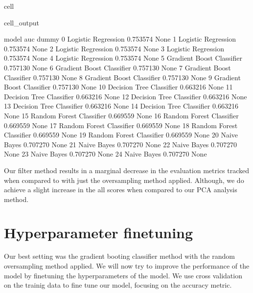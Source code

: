 \documentclass[letterpaper,10pt,english]{jupyterBook}
\begin{document}
\begin{sphinxuseclass}{cell}
\begin{sphinxVerbatimOutput}
\begin{sphinxuseclass}{cell_output}
\begin{sphinxVerbatim}[commandchars=\\\{\}]
                        model       auc dummy  
0        Logistic Regression   0.753574  None  
1        Logistic Regression   0.753574  None  
2        Logistic Regression   0.753574  None  
3        Logistic Regression   0.753574  None  
4        Logistic Regression   0.753574  None  
5   Gradient Boost Classifier  0.757130  None  
6   Gradient Boost Classifier  0.757130  None  
7   Gradient Boost Classifier  0.757130  None  
8   Gradient Boost Classifier  0.757130  None  
9   Gradient Boost Classifier  0.757130  None  
10   Decision Tree Classifier  0.663216  None  
11   Decision Tree Classifier  0.663216  None  
12   Decision Tree Classifier  0.663216  None  
13   Decision Tree Classifier  0.663216  None  
14   Decision Tree Classifier  0.663216  None  
15   Random Forest Classifier  0.669559  None  
16   Random Forest Classifier  0.669559  None  
17   Random Forest Classifier  0.669559  None  
18   Random Forest Classifier  0.669559  None  
19   Random Forest Classifier  0.669559  None  
20                Naive Bayes  0.707270  None  
21                Naive Bayes  0.707270  None  
22                Naive Bayes  0.707270  None  
23                Naive Bayes  0.707270  None  
24                Naive Bayes  0.707270  None  
\end{sphinxVerbatim}

\end{sphinxuseclass}\end{sphinxVerbatimOutput}

\end{sphinxuseclass}
\sphinxAtStartPar
Our filter method results in a marginal decrease in the evaluation metrics tracked when compared to with just the oversampling method applied. Although, we do achieve a slight increase in the all scores when compared to our PCA analysis method.


\section{Hyperparameter finetuning}
\label{\detokenize{Model_evaluation:hyperparameter-finetuning}}
\sphinxAtStartPar
Our best setting was the gradient booting classifier method with the random oversampling method applied. We will now try to improve the performance of the model by finetuning the hyperparameters of the model. We use cross validation on the trainig data to fine tune our model, focusing on the accuracy metric.
\end{document}
